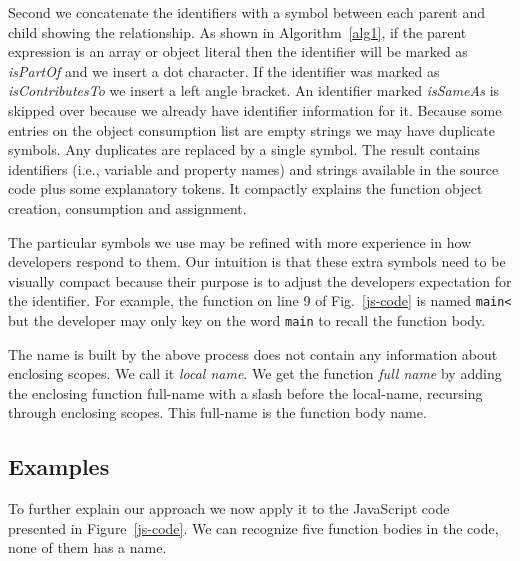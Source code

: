 \documentclass[10pt, preprint]{sigplanconf}
\begin{document}
Second we concatenate the identifiers with a symbol between each parent and child showing the relationship.  As shown in Algorithm~\ref{alg1},  
if the parent expression is an array or object literal then the identifier will be marked  as \textit{isPartOf} and we insert a dot character. If the identifier was marked as  \textit{isContributesTo} we insert a left angle bracket. An identifier marked \textit{isSameAs} is skipped over because we already have identifier information for it. Because some entries on the object consumption list are empty strings we may have duplicate symbols. Any duplicates are replaced by a single symbol. The result contains identifiers (i.e., variable and property names) and strings available in the source code plus some explanatory tokens. It compactly explains the function object creation, consumption and assignment.
 
The particular symbols we use may be refined with more experience in how developers respond to them. Our intuition is that these extra symbols need to be visually compact because their purpose is to adjust the developers expectation for the identifier. For example, the function on line 9 of Fig.~\ref{js-code} is named \texttt{main<} but the developer may only key on the word \texttt{main} to recall the function body. 

The name is built by the above process does not contain any information about enclosing scopes. We call it \textit{local name}. We get the function \textit{full name} by adding the enclosing function full-name with a slash before the local-name, recursing through enclosing scopes. This full-name is the function body name.



\subsection{Examples}
\label{sec:examples}

To further explain our approach we now apply it to the JavaScript code presented in Figure~\ref{js-code}. We can recognize five function bodies in the code, none of them has a name. 
\end{document}
